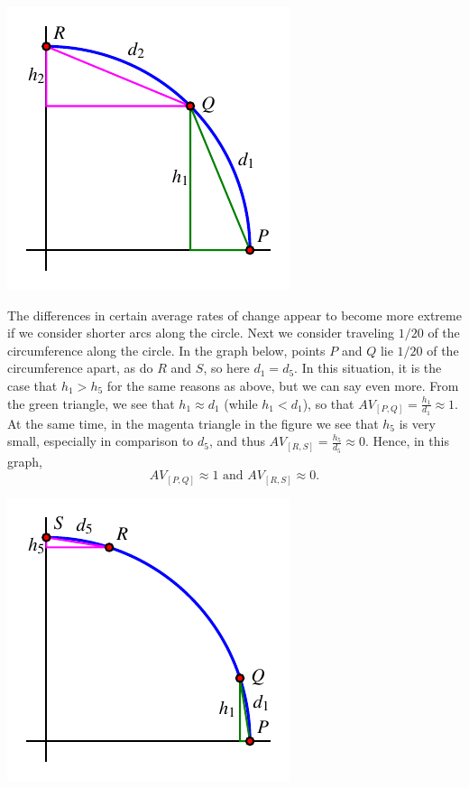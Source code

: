 \documentclass[nooutcomes, noauthor]{ximera}
\begin{document}
\begin{image}
\includegraphics{traversing-circular-aroc-circle-eighth.pdf}
\end{image}

The differences in certain average rates of change appear to become more extreme if we consider shorter arcs along the circle.  Next we consider traveling \(1/20\) of the circumference along the circle.  In the graph below, points \(P\) and \(Q\) lie \(1/20\) of the circumference apart, as do \(R\) and \(S\), so here \(d_1 = d_5\).  In this situation, it is the case that \(h_1 \gt h_5\) for the same reasons as above, but we can say even more.  From the green triangle, we see that \(h_1 \approx d_1\) (while \(h_1 \lt d_1\)), so that \(AV_{[P,Q]} = \frac{h_1}{d_1} \approx 1\).  At the same time, in the magenta triangle in the figure we see that \(h_5\) is very small, especially in comparison to \(d_5\), and thus \(AV_{[R,S]} = \frac{h_5}{d_5} \approx 0\).  Hence, in this graph,%
\begin{equation*}
AV_{[P,Q]} \approx 1 \text{ and } AV_{[R,S]} \approx 0\text{.}
\end{equation*}

\begin{image}
\includegraphics{traversing-circular-aroc-circle-20th.pdf}
\end{image}
\end{document}
